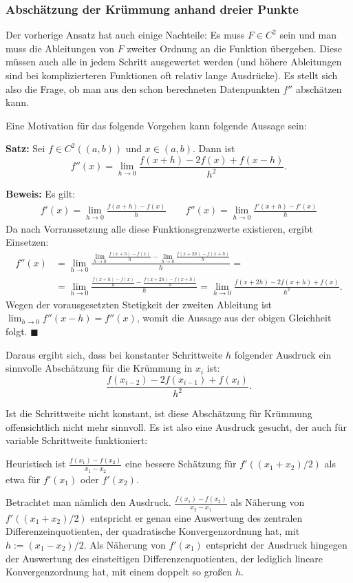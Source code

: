 \documentclass[a4paper,11pt,bibliography=totoc,listof=totoc,headinclude=true,cleardoublepage=empty,oneside]{scrartcl}
\newcounter{satz}
\begin{document}
\subsubsection{Abschätzung der Krümmung anhand dreier Punkte}\label{chap:5.1.2}
Der vorherige Ansatz hat auch einige Nachteile: Es muss $F \in C^2$ sein und man muss die Ableitungen von $F$ zweiter Ordnung an die Funktion übergeben. Diese müssen auch alle in jedem Schritt ausgewertet werden (und höhere Ableitungen sind bei komplizierteren Funktionen oft relativ lange Ausdrücke). Es stellt sich also die Frage, ob man aus den schon berechneten Datenpunkten $f''$ abschätzen kann.

Eine Motivation für das folgende Vorgehen kann folgende Aussage sein:

\textbf{Satz:} Sei $f \in C^2((a,b))$ und $x \in (a,b)$. Dann ist 
\[
f''(x) = \lim_{h \to 0} \frac{f(x+h) -2f(x) + f(x-h)}{h^2}.
\]

\textbf{Beweis:}
Es gilt:
\begin{align*}
f'(x) = \lim_{h \to 0} \frac{f(x+h)-f(x)}{h} \qquad  f''(x) = \lim_{h \to 0} \frac{f'(x+h)-f'(x)}{h}
\end{align*}
Da nach Vorraussetzung alle diese Funktionsgrenzwerte existieren, ergibt Einsetzen:
\begin{align*}
f''(x) &= \lim_{h \to 0} \frac{\lim_{h \to 0} \frac{f(x+h)-f(x)}{h}-\lim_{h \to 0} \frac{f(x+2h)-f(x+h)}{h}}{h} = \\
&=\lim_{h \to 0}  \frac{\frac{f(x+h)-f(x)}{h}- \frac{f(x+2h)-f(x+h)}{h}}{h} = \lim_{h \to 0} \frac{f(x+2h) -2f(x+h) + f(x)}{h^2}.
\end{align*}
Wegen der vorausgesetzten Stetigkeit der zweiten Ableitung ist $\lim_{h \to 0} f''(x-h)=f''(x)$, womit die Aussage aus der obigen Gleichheit folgt. \hfill $\blacksquare$

Daraus ergibt sich, dass bei konstanter Schrittweite $h$ folgender Ausdruck ein sinnvolle Abschätzung für die Krümmung in $x_i$ ist:
\[
\frac{f(x_{i-2})-2f(x_{i-1})+f(x_i)}{h^2}.
\]

Ist die Schrittweite nicht konstant, ist diese Abschätzung für Krümmung offensichtlich nicht mehr sinnvoll. Es ist also eine Ausdruck gesucht, der auch für variable Schrittweite funktioniert:

Heuristisch ist $\frac{f(x_1)-f(x_2)}{x_1-x_2}$ eine bessere Schätzung für $f'((x_1+x_2)/2)$ als etwa für $f'(x_1)$ oder $f'(x_2)$. 

Betrachtet man nämlich den Ausdruck. $\frac{f(x_1)-f(x_2)}{x_2-x_1}$  als Näherung von  $f'((x_1+x_2)/2)$ entspricht er genau eine Auswertung des zentralen Differenzeinquotienten, der quadratische Konvergenzordnung hat, mit $h:= (x_1-x_2)/2$. Als Näherung von $f'(x_1)$ entspricht der Ausdruck hingegen der Auswertung des einsteitigen Differenzenquotienten, der lediglich lineare Konvergenzordnung hat, mit einem doppelt so großen $h$.
\end{document}
